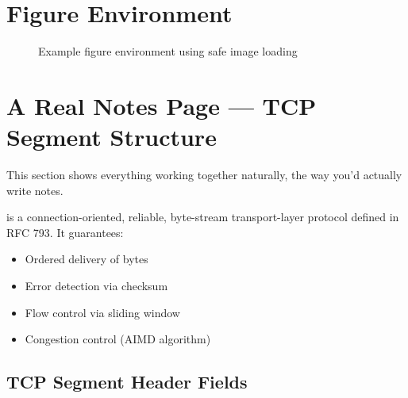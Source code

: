 \documentclass[main.tex]{subfiles}
\begin{document}
\section{Figure Environment}

\begin{figure}[H]
    \centering
    \caption{Example figure environment using safe image loading}
    \label{fig:showcase-figure}
\end{figure}

\section{A Real Notes Page — TCP Segment Structure}

This section shows everything working together naturally, the way you'd actually
write notes.

\begin{definitionbox}
 is a connection-oriented, reliable, byte-stream transport-layer
protocol defined in RFC 793. It guarantees:
\begin{itemize}
    \item Ordered delivery of bytes
    \item Error detection via checksum
    \item Flow control via sliding window
    \item Congestion control (AIMD algorithm)
\end{itemize}
\end{definitionbox}

\subsection{TCP Segment Header Fields}
\end{document}
